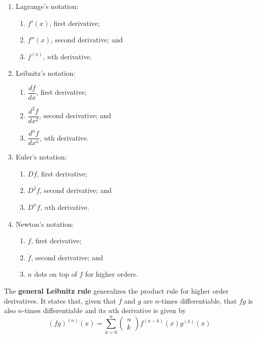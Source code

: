 \begin{enumerate}
    \item Lagrange's notation:
    \begin{enumerate}
        \item $f'(x)$, first derivative;
        \item $f''(x)$, second derivative; and
        \item $f^{(n)}$, $n$th derivative.
    \end{enumerate}
    
    \item Leibnitz's notation:
    \begin{enumerate}
        \item $\dfrac{df}{dx}$, first derivative;
        \item $\dfrac{d^2f}{dx^2}$, second derivative; and 
        \item $\dfrac{d^nf}{dx^n}$, $n$th derivative.
    \end{enumerate}
    
    \item Euler's notation:
    \begin{enumerate}
        \item $Df$, first derivative;
        \item $D^2f$, second derivative; and
        \item $D^nf$, $n$th derivative.
    \end{enumerate}
    
    \item Newton's notation:
    \begin{enumerate}
        \item $\dot f$, first derivative;
        \item $\ddot f$, second derivative; and
        \item $n$ dots on top of $f$ for higher orders.
    \end{enumerate}
\end{enumerate}

\begin{theorem}
    The \textbf{general Leibnitz rule} generalizes the product rule for higher order derivatives. It states that, given that $f$ and $g$ are $n$-times differentiable, that $fg$ is also $n$-times differentiable and its $n$th derivative is given by 
    \[
        (fg)^{(n)}(x)=\sum_{k=0}^n
        \begin{pmatrix}
            n\\k
        \end{pmatrix}
        f^{(n-k)}(x)g^{(k)}(x)
    \] 
\end{theorem}

